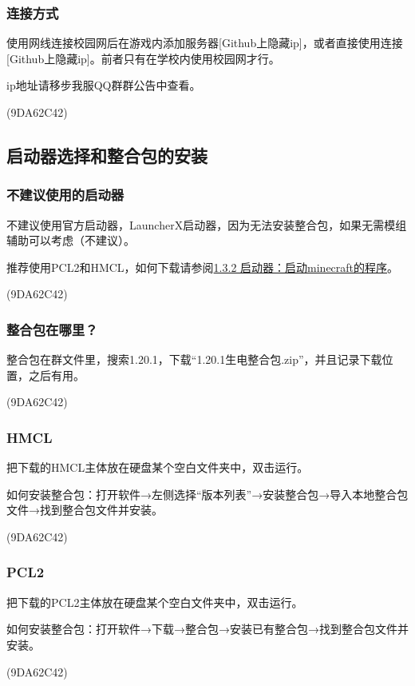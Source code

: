 \documentclass[UTF8,a4paper]{article}
\begin{document}
			\subsubsection{连接方式}
				\par 使用网线连接校园网后在游戏内添加服务器[Github上隐藏ip]，或者直接使用连接[Github上隐藏ip]。前者只有在学校内使用校园网才行。
				\par ip地址请移步我服QQ群群公告中查看。
				\begin{flushright}(9DA62C42)\end{flushright}
		\subsection{启动器选择和整合包的安装}
			\hypertarget{qidongqixuanze}{}
			\subsubsection{不建议使用的启动器}
				\par 不建议使用官方启动器，LauncherX启动器，因为无法安装整合包，如果无需模组辅助可以考虑（不建议）。
				\par 推荐使用PCL2和HMCL，如何下载请参阅\hyperlink{qidongqi}{1.3.2 启动器：启动minecraft的程序}。
				\begin{flushright}(9DA62C42)\end{flushright}
			\subsubsection{整合包在哪里？}
				\par 整合包在群文件里，搜索1.20.1，下载“1.20.1生电整合包.zip”，并且记录下载位置，之后有用。
				\begin{flushright}(9DA62C42)\end{flushright}
			\subsubsection{HMCL}
				\par 把下载的HMCL主体放在硬盘某个空白文件夹中，双击运行。
				\par 如何安装整合包：打开软件→左侧选择“版本列表”→安装整合包→导入本地整合包文件→找到整合包文件并安装。
				\begin{flushright}(9DA62C42)\end{flushright}
			\subsubsection{PCL2}
				\par 把下载的PCL2主体放在硬盘某个空白文件夹中，双击运行。
				\par 如何安装整合包：打开软件→下载→整合包→安装已有整合包→找到整合包文件并安装。
				\begin{flushright}(9DA62C42)\end{flushright}
\end{document}
